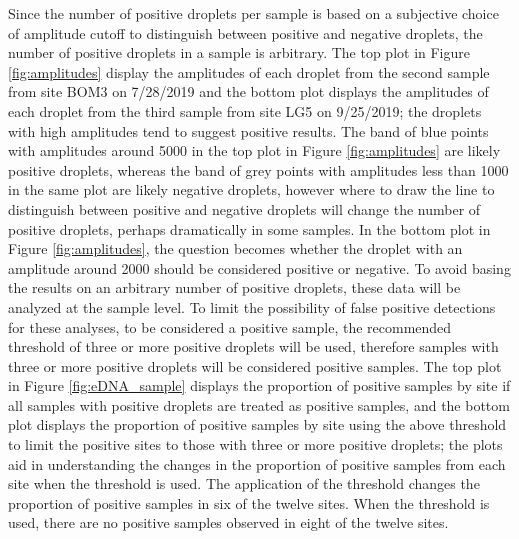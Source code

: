 \documentclass[12pt]{article}\usepackage[]{graphicx}\usepackage[]{color}
\begin{document}
Since the number of positive droplets per sample is based on a subjective choice of amplitude cutoff to distinguish between positive and negative droplets, the number of positive droplets in a sample is arbitrary. The top plot in Figure \ref{fig:amplitudes} display the amplitudes of each droplet from the second sample from site BOM3 on 7/28/2019 and the bottom plot displays the amplitudes of each droplet from the third sample from site LG5 on 9/25/2019; the droplets with high amplitudes tend to suggest positive results. The band of blue points with amplitudes around 5000 in the top plot in Figure \ref{fig:amplitudes} are likely positive droplets, whereas the band of grey points with amplitudes less than 1000 in the same plot are likely negative droplets, however where to draw the line to distinguish between positive and negative droplets will change the number of positive droplets, perhaps dramatically in some samples. In the bottom plot in Figure \ref{fig:amplitudes}, the question becomes whether the droplet with an amplitude around 2000 should be considered positive or negative. To avoid basing the results on an arbitrary number of positive droplets, these data will be analyzed at the sample level. To limit the possibility of false positive detections for these analyses, to be considered a positive sample, the recommended threshold of three or more positive droplets will be used, therefore samples with three or more positive droplets will be considered positive samples. The top plot in Figure \ref{fig:eDNA_sample} displays the proportion of positive samples by site if all samples with positive droplets are treated as positive samples, and the bottom plot displays the proportion of positive samples by site using the above threshold to limit the positive sites to those with three or more positive droplets; the plots aid in understanding the changes in the proportion of positive samples from each site when the threshold is used. The application of the threshold changes the proportion of positive samples in six of the twelve sites. When the threshold is used, there are no positive samples observed in eight of the twelve sites. 
\end{document}
